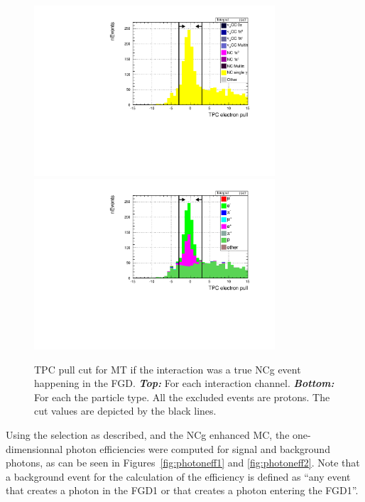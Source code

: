\begin{figure}[ht]
  \center
  \includegraphics[width=0.8\textwidth]{images/NCg/3_selelec_tpc1_pullelec_pitoponcg.pdf} \\
  \includegraphics[width=0.8\textwidth]{images/NCg/3_selelec_tpc1_pullelec_particle.pdf}
  \caption[TPC pull cut for Main Track if the interaction was a true
  NC$\gamma$ event happening in the FGD1]{\Gls{TPC} pull cut for
    \Gls{MT} if the interaction was a true \Gls{NCg} event happening
    in the \Gls{FGD}. \textbf{\textit{Top:}} For each interaction
    channel. \textbf{\textit{Bottom:}} For each the particle type.
    All the excluded events are protons. The cut values are depicted
    by the black lines.}
  \label{fig:pullncg}
\end{figure}

Using the selection as described, and the \Gls{NCg} enhanced \Gls{MC},
the one-dimensionnal photon efficiencies were computed for signal and
background photons, as can be seen in Figures~\ref{fig:photoneff1} and
\ref{fig:photoneff2}. Note that a background event for the calculation
of the efficiency is defined as ``any event that creates a photon in
the \Gls{FGD}1 or that creates a photon entering the \Gls{FGD}1''.

